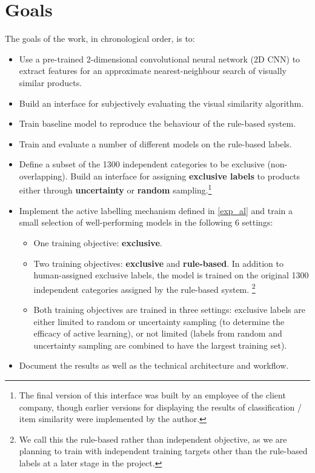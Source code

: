 \section{Goals}

The goals of the work, in chronological order, is to:

\begin{itemize}
  \item Use a pre-trained 2-dimensional convolutional neural network (2D CNN) to extract features for an approximate nearest-neighbour search of visually similar products.
  \item Build an interface for subjectively evaluating the visual similarity algorithm.
  \item Train  baseline model to reproduce the behaviour of the rule-based system.
  \item Train and evaluate a number of different models on the rule-based labels.
  \item
    Define a subset of the 1300 independent categories to be exclusive (non-overlapping).
    Build an interface for assigning \textbf{exclusive labels} to products either through \textbf{uncertainty} or \textbf{random} sampling.\footnote{The final version of this interface was built by an employee of the client company, though earlier versions for displaying the results of classification / item similarity were implemented by the author.}
  \item Implement the active labelling mechanism defined in \ref{exp_al} and train a small selection of well-performing models in the following 6 settings:
    \begin{itemize}
      \item One training objective: \textbf{exclusive}.
      \item Two training objectives: \textbf{exclusive} and \textbf{rule-based}. In addition to human-assigned exclusive labels, the model is trained on the original 1300 independent categories assigned by the rule-based system. \footnote{We call this the rule-based rather than independent objective, as we are planning to train with independent training targets other than the rule-based labels at a later stage in the project.}
      \item Both training objectives are trained in three settings: exclusive labels are either limited to random or uncertainty sampling (to determine the efficacy of active learning), or not limited (labels from random and uncertainty sampling are combined to have the largest training set).
    \end{itemize}
  \item Document the results as well as the technical architecture and workflow.
\end{itemize}

